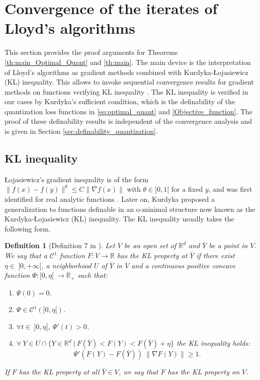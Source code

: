 \documentclass[11pt]{article}
\newcommand{\1}{\mathbbm{1}}
\newtheorem{defn}[lem]{Definition}
\numberwithin{equation}{section}
\begin{document}
\section{Convergence of the iterates of Lloyd's algorithms}
\label{sec:convergence}
This section provides the proof arguments for Theorems \ref{th:main_Optimal_Quant} and \ref{th:main}. The main device is the interpretation of Lloyd's algorithms as gradient methods combined with Kurdyka-\L{ojasiewicz} (KL) inequality. This allows to invoke sequential convergence results for gradient methods on functions verifying KL inequality \cite{AbsMahAnd2005,attouch2013convergence}. The KL inequality is verified in our cases by Kurdyka's sufficient condition, which is the definability of the quantization loss functions in \eqref{eq:optimal_quant} and \eqref{Objective_function}. The proof of these definability results is independent of the convergence analysis and is given in Section \ref{sec:definability_quantization}.



\subsection{KL inequality}\label{section_KL}
\L{ojasiewicz}'s gradient inequality is of the form $\|f(x)-f(y)\|^{\theta} \leq C\|\nabla f(x)\| $ with $\theta \in ]0,1[$ for a fixed $y$, and was first identified for real analytic functions \cite{Lojasiewicz1963propriete}. Later on, Kurdyka \cite{KurdykaarticleominimpliqueKL} proposed a generalization to functions definable in an o-minimal structure now known as the Kurdyka-\L{ojasiewicz} (KL) inequality. The KL inequality usually takes the following form.
\begin{defn}[Definition 7 in \cite{proximalbolte2010defKL}]\label{def:KL_property}
    Let $V$ be an open set of $\mathbb{R}^{d}$ and $\bar{Y}$ be a point in $V$. We say that a $\mathcal{C}^{1}$ function $F: V \to \mathbb{R}$ has the KL property at $\bar{Y}$ if there exist $\eta\in \ ]0,+\infty[$, a neighborhood $U$ of $\bar{Y}$ in $V$ and a continuous positive concave function $\Psi:[0,\eta[ \ \to \mathbb{R}_{+}$  such that:
    \begin{enumerate}
        \itemsep0em 
        \item $\Psi(0)=0$.
        \item $\Psi\in \mathcal{C}^{1}(]0,\eta[)$.
        \item $\forall t \in \ ]0,\eta[,\: \Psi'(t)>0$.
        \item $\forall \ Y\in U\cap \{Y\in \mathbb{R}^{d}\:|\: F(\bar{Y})< F(Y) < F(\bar{Y})+\eta\}$ the KL inequality holds:
            \begin{equation*}
            \Psi'(F(Y)-F(\bar{Y}))\ \|\nabla F(Y)\|\geq 1.
            \end{equation*}
    \end{enumerate}
     If $F$ has the KL property at all $ \bar{Y} \in V$, we say that $F$ has the KL property on $V$.
\end{defn}  
\end{document}
